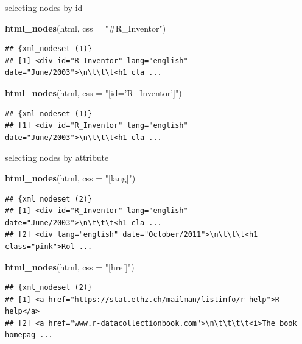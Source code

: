 \documentclass[ignorenonframetext,]{beamer}
\newenvironment{Shaded}{\begin{snugshade}}{\end{snugshade}}
\newcommand{\KeywordTok}[1]{\textcolor[rgb]{0.13,0.29,0.53}{\textbf{{#1}}}}
\newcommand{\DataTypeTok}[1]{\textcolor[rgb]{0.13,0.29,0.53}{{#1}}}
\newcommand{\StringTok}[1]{\textcolor[rgb]{0.31,0.60,0.02}{{#1}}}
\newcommand{\NormalTok}[1]{{#1}}
\begin{document}
\begin{frame}[fragile]{selecting nodes by id}

\begin{Shaded}
\begin{Highlighting}[]
\KeywordTok{html_nodes}\NormalTok{(html, }\DataTypeTok{css =} \StringTok{"#R_Inventor"}\NormalTok{)}
\end{Highlighting}
\end{Shaded}

\begin{verbatim}
## {xml_nodeset (1)}
## [1] <div id="R_Inventor" lang="english" date="June/2003">\n\t\t\t<h1 cla ...
\end{verbatim}

\begin{Shaded}
\begin{Highlighting}[]
\KeywordTok{html_nodes}\NormalTok{(html, }\DataTypeTok{css =} \StringTok{"[id='R_Inventor']"}\NormalTok{)}
\end{Highlighting}
\end{Shaded}

\begin{verbatim}
## {xml_nodeset (1)}
## [1] <div id="R_Inventor" lang="english" date="June/2003">\n\t\t\t<h1 cla ...
\end{verbatim}

\end{frame}

\begin{frame}[fragile]{selecting nodes by attribute}

\begin{Shaded}
\begin{Highlighting}[]
\KeywordTok{html_nodes}\NormalTok{(html, }\DataTypeTok{css =} \StringTok{"[lang]"}\NormalTok{)}
\end{Highlighting}
\end{Shaded}

\begin{verbatim}
## {xml_nodeset (2)}
## [1] <div id="R_Inventor" lang="english" date="June/2003">\n\t\t\t<h1 cla ...
## [2] <div lang="english" date="October/2011">\n\t\t\t<h1 class="pink">Rol ...
\end{verbatim}

\begin{Shaded}
\begin{Highlighting}[]
\KeywordTok{html_nodes}\NormalTok{(html, }\DataTypeTok{css =} \StringTok{"[href]"}\NormalTok{)}
\end{Highlighting}
\end{Shaded}

\begin{verbatim}
## {xml_nodeset (2)}
## [1] <a href="https://stat.ethz.ch/mailman/listinfo/r-help">R-help</a>
## [2] <a href="www.r-datacollectionbook.com">\n\t\t\t\t<i>The book homepag ...
\end{verbatim}

\end{frame}
\end{document}
